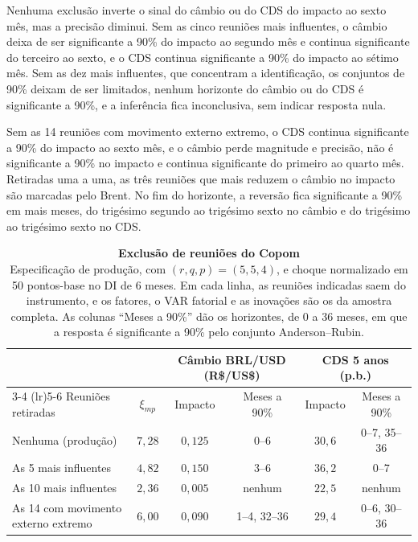 \documentclass[preprint,authoryear,review,12pt]{elsarticle}
\begin{document}
Nenhuma exclusão inverte o sinal do câmbio ou do CDS do impacto ao sexto mês, mas a precisão diminui. Sem as cinco reuniões mais influentes, o câmbio deixa de ser significante a 90\% do impacto ao segundo mês e continua significante do terceiro ao sexto, e o CDS continua significante a 90\% do impacto ao sétimo mês. Sem as dez mais influentes, que concentram a identificação, os conjuntos de 90\% deixam de ser limitados, nenhum horizonte do câmbio ou do CDS é significante a 90\%, e a inferência fica inconclusiva, sem indicar resposta nula.

Sem as 14 reuniões com movimento externo extremo, o CDS continua significante a 90\% do impacto ao sexto mês, e o câmbio perde magnitude e precisão, não é significante a 90\% no impacto e continua significante do primeiro ao quarto mês. Retiradas uma a uma, as três reuniões que mais reduzem o câmbio no impacto são marcadas pelo Brent. No fim do horizonte, a reversão fica significante a 90\% em mais meses, do trigésimo segundo ao trigésimo sexto no câmbio e do trigésimo ao trigésimo sexto no CDS.

\begin{table}[H]
\centering
\footnotesize
\setlength{\tabcolsep}{4pt}
\begin{tabular}{@{}l c c c c c@{}}
\toprule
 & & \multicolumn{2}{c}{Câmbio BRL/USD (R\$/US\$)} & \multicolumn{2}{c}{CDS 5 anos (p.b.)} \\
\cmidrule(lr){3-4} \cmidrule(lr){5-6}
Reuniões retiradas & $\xi_{mp}$ & Impacto & Meses a 90\% & Impacto & Meses a 90\% \\
\midrule
Nenhuma (produção)                   & $7{,}28$ & $0{,}125$ & 0--6         & $30{,}6$ & 0--7, 35--36 \\
As 5 mais influentes                 & $4{,}82$ & $0{,}150$ & 3--6         & $36{,}2$ & 0--7 \\
As 10 mais influentes                & $2{,}36$ & $0{,}005$ & nenhum       & $22{,}5$ & nenhum \\
As 14 com movimento externo extremo  & $6{,}00$ & $0{,}090$ & 1--4, 32--36 & $29{,}4$ & 0--6, 30--36 \\
\bottomrule
\end{tabular}
\caption{\textbf{Exclusão de reuniões do Copom}\\{Especificação de produção, com $(r,q,p)=(5,5,4)$, e choque normalizado em 50 pontos-base no DI de 6 meses. Em cada linha, as reuniões indicadas saem do instrumento, e os fatores, o VAR fatorial e as inovações são os da amostra completa. As colunas ``Meses a 90\%'' dão os horizontes, de 0 a 36 meses, em que a resposta é significante a 90\% pelo conjunto Anderson--Rubin.}}
\label{tab:influencia}
\end{table}
\end{document}
